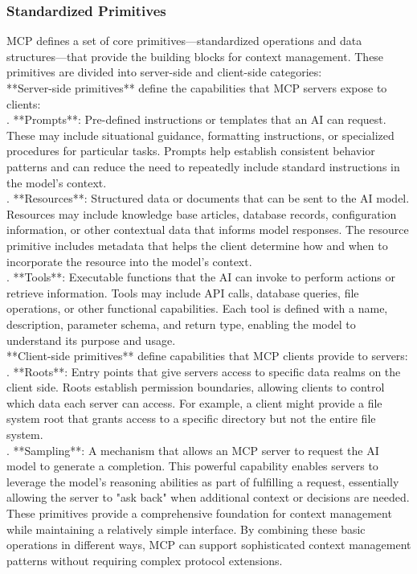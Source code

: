 \subsubsection{Standardized Primitives}
MCP defines a set of core primitives—standardized operations and data structures—that provide the building blocks for context management. These primitives are divided into server-side and client-side categories:\\ \newline
**Server-side primitives** define the capabilities that MCP servers expose to clients:\\ . **Prompts**: Pre-defined instructions or templates that an AI can request. These may include situational guidance, formatting instructions, or specialized procedures for particular tasks. Prompts help establish consistent behavior patterns and can reduce the need to repeatedly include standard instructions in the model's context.\\ . **Resources**: Structured data or documents that can be sent to the AI model. Resources may include knowledge base articles, database records, configuration information, or other contextual data that informs model responses. The resource primitive includes metadata that helps the client determine how and when to incorporate the resource into the model's context.\\ . **Tools**: Executable functions that the AI can invoke to perform actions or retrieve information. Tools may include API calls, database queries, file operations, or other functional capabilities. Each tool is defined with a name, description, parameter schema, and return type, enabling the model to understand its purpose and usage.\\ \newline
**Client-side primitives** define capabilities that MCP clients provide to servers:\\ . **Roots**: Entry points that give servers access to specific data realms on the client side. Roots establish permission boundaries, allowing clients to control which data each server can access. For example, a client might provide a file system root that grants access to a specific directory but not the entire file system.\\ . **Sampling**: A mechanism that allows an MCP server to request the AI model to generate a completion. This powerful capability enables servers to leverage the model's reasoning abilities as part of fulfilling a request, essentially allowing the server to "ask back" when additional context or decisions are needed.\\ \newline
These primitives provide a comprehensive foundation for context management while maintaining a relatively simple interface. By combining these basic operations in different ways, MCP can support sophisticated context management patterns without requiring complex protocol extensions.\\
